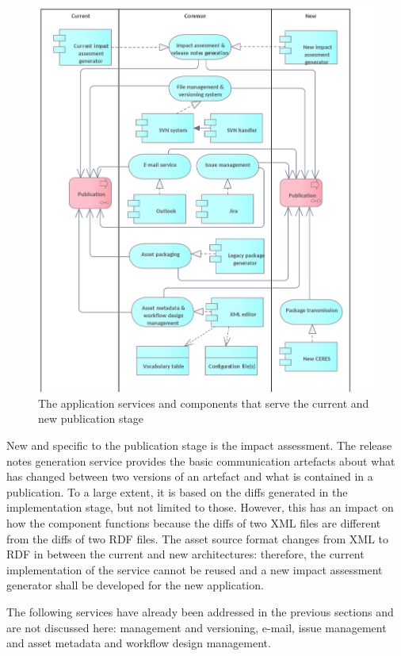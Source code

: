 	\begin{figure}[!h]
		\centering
		\includegraphics[width=.9\textwidth]{images/application/Publication v3.png}
		\caption{The application services and components that serve the current and new publication stage}
		\label{fig:application-publication}
	\end{figure}

	New and specific to the publication stage is the impact assessment. The release notes generation service provides the basic communication artefacts about what has changed between two versions of an artefact and what is contained in a publication. To a large extent, it is based on the diffs generated in the implementation stage, but not limited to those. However, this has an impact on how the component functions because the diffs of two XML files are different from the diffs of two RDF files. The asset source format changes from XML to RDF in between the current and new architectures: therefore, the current implementation of the service cannot be reused and a new impact assessment generator shall be developed for the new application. 

	The following services have already been addressed in the previous sections and are not discussed here: management and versioning, e-mail, issue management and asset metadata and workflow design management. 
	
